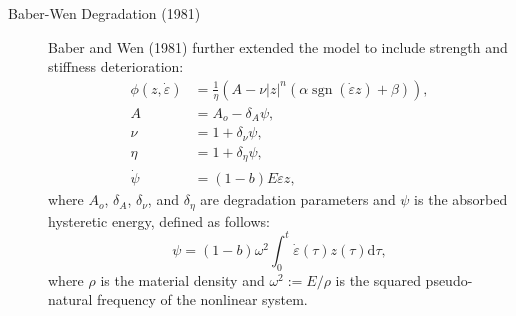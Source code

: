 \begin{description}
\item[Baber-Wen Degradation (1981)]
Baber and Wen (1981) \cite{baber1981random} further extended the model to 
include strength and stiffness deterioration:
\begin{equation}
\begin{aligned}
\phi(z,\dot{\varepsilon})&=\frac{1}{\eta}\left(A- \nu |z|^{n} \left(\alpha \operatorname{sgn}(\dot{\varepsilon} z)+\beta\right) \right),
\\
A &=A_{o}-\delta_{A} \psi,   \\
\nu &=1+\delta_{\nu} \psi,   \\
\eta &=1+\delta_{\eta} \psi, \\
\dot{\psi} & =(1-b) E \dot{\varepsilon} z, 
\end{aligned}
\label{eq:bouc-family4}
\end{equation}
where $A_{o}$, $\delta_{A}$, $\delta_{\nu}$, and $\delta_{\eta}$ are degradation parameters and $\psi$ is the absorbed hysteretic energy, defined as follows:
\begin{equation}
\psi = (1-b) \omega^2 \int_0^t \dot{\varepsilon}(\tau) z(\tau) \mathrm{d} \tau,
\label{eq:bouc-family5}
\end{equation}
where $\rho$ is the material density and $\omega^2:={E}/{\rho}$ is the squared pseudo-natural frequency of the nonlinear system.
\end{description}

